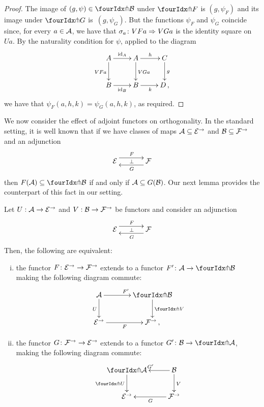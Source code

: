 \documentclass[reqno,10pt,a4paper,oneside]{amsart}
\begin{document}
\begin{proof} The image of $(g, \psi) \in \liftr{\cal{B}}$ under $\liftr{F}$ is $(g, \psi_F)$ and its
image under $\liftr{G}$ is~$(g, \psi_G)$. But the functions $\psi_F$ and $\psi_G$ coincide since, for
every $a \in \cal{A}$, we have that $\sigma_a \co VFa \Rightarrow VGa$ is the identity square on $Ua$. 
By the naturality condition for $\psi$, applied to the diagram 
\[
\xymatrix{
A \ar[r]^{\id_A} \ar[d]_{VFa}  & A \ar[d]^{VGa} \ar[r]^{h}  & C \ar[d]^g \\
B \ar[r]_{\id_B} & B \ar[r]_{k} & D \, ,}
\]
we have  that $\psi_F(a, h, k) = \psi_G(a, h, k)$, as required.
\end{proof} 

\medskip

We now consider the effect of adjoint functors on orthogonality. In the standard setting, it is well known that if 
we have classes of maps $\cal{A} \subseteq \cal{E}^\to$ and $\cal{B} \subseteq \cal{F}^\to$ and an adjunction
\[
\xymatrix@C+1em{
  \cal{E}
  \ar@<5pt>[r]^{F}
  \ar@{}[r]|{\bot}
&
  \cal{F}
  \ar@<5pt>[l]^{G}
}
\]
then $F(\cal{A}) \subseteq \liftl{\cal{B}}$ if and only if $\cal{A} \subseteq G(\cal{B})$. Our next lemma provides the counterpart of this fact in our setting.




\begin{lemma} \label{lift-of-adjunction} 
Let $U : \cal{A} \to \cal{E}^{\to}$ and $V : \cal{B} \to \cal{F}^{\to}$ be functors and consider an adjunction
\[
\xymatrix@C+1em{
  \cal{E}
  \ar@<5pt>[r]^{F}
  \ar@{}[r]|{\bot}
&
  \cal{F}
  \ar@<5pt>[l]^{G}
}
\]
Then, the following are equivalent:
\begin{enumerate}[(i)] 
\item the  functor $F \co \cal{E}^\to \to \cal{F}^\to$ extends to a functor $F' \co \cal{A} \to \liftl{\cal{B}}$ making the following diagram commute:
\[
\xymatrix@C=1.2cm{
  \cal{A}
  \ar[r]^{F'}
  \ar[d]_{U}
&
  \liftl{\cal{B}}
  \ar[d]^{\liftl{V}}
\\
  \cal{E}^{\to}
  \ar[r]_-{F}
&
  \cal{F}^{\to}\, ,}
\]
\item the functor $G \co \cal{F}^\to \to \cal{E}^\to$ extends to a functor $G' \co \cal{B} \to \liftr{\cal{A}}$, making the following diagram commute:
\[
\xymatrix{
  \liftr{\cal{A}}
  \ar[d]_{\liftr{U}}
&
  \cal{B}
  \ar[l]_{G'} 
  \ar[d]^{V}
\\
  \cal{E}^{\to}
&
  \cal{F}^{\to}
  \ar[l]^{G}
}
\]
\end{enumerate}
\end{lemma}
\end{document}
